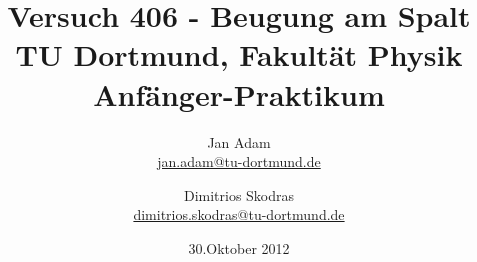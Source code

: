 



\title{Versuch 406 - Beugung am Spalt\\				%
\large TU Dortmund, Fakultät Physik\\ 
\normalsize Anfänger-Praktikum}

\author{Jan Adam\\			%
{\small \href{jan.adam@tu-dortmund.de}{jan.adam@tu-dortmund.de}}	%
\and						%
Dimitrios Skodras\\					%
{\small \href{dimitrios.skodras@tu-dortmund.de}{dimitrios.skodras@tu-dortmund.de}}		%
}
\date{30.Oktober 2012}				%





\maketitle					%
\thispagestyle{empty} 				%



\tableofcontents


\newpage					%



